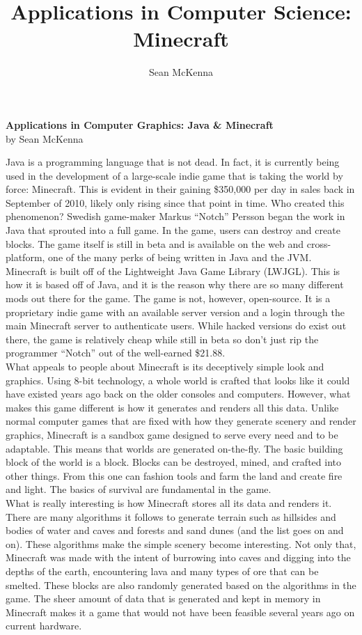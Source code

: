\documentclass[11pt]{article}
\title{Applications in Computer Science: Minecraft}
\author{Sean McKenna}
\begin{document}
\begin{center}
  \textbf{Applications in Computer Graphics: Java \& Minecraft} \\
  by Sean McKenna
\end{center}

Java is a programming language that is not dead. In fact, it is currently being used in the development of a large-scale indie game that is taking the world by force: Minecraft. This is evident in their gaining \$350,000 per day in sales back in September of 2010, likely only rising since that point in time. Who created this phenomenon? Swedish game-maker Markus ``Notch'' Persson began the work in Java that sprouted into a full game. In the game, users can destroy and create blocks. The game itself is still in beta and is available on the web and cross-platform, one of the many perks of being written in Java and the JVM. \\

Minecraft is built off of the Lightweight Java Game Library (LWJGL). This is how it is based off of Java, and it is the reason why there are so many different mods out there for the game. The game is not, however, open-source. It is a proprietary indie game with an available server version and a login through the main Minecraft server to authenticate users. While hacked versions do exist out there, the game is relatively cheap while still in beta so don't just rip the programmer ``Notch'' out of the well-earned \$21.88. \\

What appeals to people about Minecraft is its deceptively simple look and graphics. Using 8-bit technology, a whole world is crafted that looks like it could have existed years ago back on the older consoles and computers. However, what makes this game different is how it generates and renders all this data. Unlike normal computer games that are fixed with how they generate scenery and render graphics, Minecraft is a sandbox game designed to serve every need and to be adaptable. This means that worlds are generated on-the-fly. The basic building block of the world is a block. Blocks can be destroyed, mined, and crafted into other things. From this one can fashion tools and farm the land and create fire and light. The basics of survival are fundamental in the game. \\

What is really interesting is how Minecraft stores all its data and renders it. There are many algorithms it follows to generate terrain such as hillsides and bodies of water and caves and forests and sand dunes (and the list goes on and on). These algorithms make the simple scenery become interesting. Not only that, Minecraft was made with the intent of burrowing into caves and digging into the depths of the earth, encountering lava and many types of ore that can be smelted. These blocks are also randomly generated based on the algorithms in the game. The sheer amount of data that is generated and kept in memory in Minecraft makes it a game that would not have been feasible several years ago on current hardware. \\
\end{document}
